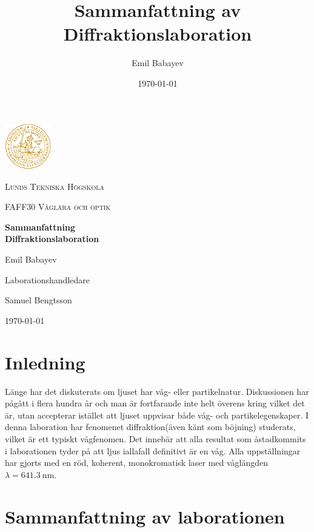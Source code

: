 \documentclass[a4paper]{article}
\title{Sammanfattning av Diffraktionslaboration}
\author{Emil Babayev}
\date{\today}
\begin{document}
\begin{titlepage}
	\centering
	\includegraphics[width=0.15\textwidth]{logo.png}\par\vspace{1cm}
	{\scshape\large Lunds Tekniska Högskola \par}
	\vspace{1cm}
    {\scshape\large FAFF30 Våglära och optik\par}
	\vspace{1.5cm}
	{\huge\bfseries Sammanfattning\\Diffraktionslaboration\par}
	\vspace{2cm}
	{\Large Emil Babayev\par}
	\vfill
	Laborationshandledare\par
    Samuel Bengtsson

    \vfill
    
	{\large \today \par}
\end{titlepage}

\section{Inledning}
Länge har det diskuterats om ljuset har våg- eller partikelnatur. Diskussionen har pågått i flera hundra år och man är fortfarande inte helt överens kring vilket det är,
utan accepterar istället att ljuset uppvisar både våg- och partikelegenskaper. I denna laboration har fenomenet diffraktion(även känt som böjning) studerats, vilket är 
ett typiskt vågfenomen. Det innebär att alla resultat som åstadkommits i laborationen tyder på att ljus iallafall definitivt är en våg. Alla uppställningar har gjorts med en
röd, koherent, monokromatisk laser med våglängden $\lambda = \SI{641.3}{\nano\meter}$.

\section{Sammanfattning av laborationen}
\end{document}
